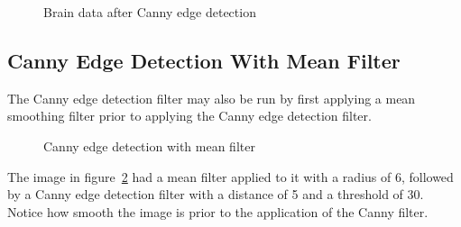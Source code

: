 \documentclass[fleqn,11pt,openany]{book}
\begin{document}
\begin{figure}
\caption{Brain data after Canny edge detection}\label{fig:CannyAfter}
\end{figure}

\subsection{Canny Edge Detection With Mean Filter}
The Canny edge detection filter may also be run by first applying a mean smoothing filter prior to applying the Canny edge detection filter. 

\begin{figure}
\caption{Canny edge detection with mean filter}\label{fig:Cannywithmeanandlayers}
\end{figure}

The image in figure~\ref{fig:Cannywithmeanandlayers} had a mean filter applied to it with a radius of 6, followed by a Canny edge detection filter with a distance of 5 and a threshold of 30. Notice how smooth the image is prior to the application of the Canny filter.
\end{document}
